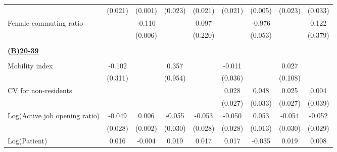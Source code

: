 \begin{tabular}{l*{8}{c}}
                    &     (0.021)         &     (0.001)         &     (0.023)         &     (0.021)         &     (0.021)         &     (0.005)         &     (0.023)         &     (0.033)         \\
\addlinespace
Female commuting ratio&                     &      -0.110\sym{***}&                     &       0.097         &                     &      -0.976\sym{***}&                     &       0.122         \\
                    &                     &     (0.006)         &                     &     (0.220)         &                     &     (0.053)         &                     &     (0.379)         \\
\hline \\ \multicolumn{9}{l}{\textbf{\underline{(B)20-39}}} \\\\[-1ex]
Mobility index      &      -0.102         &                     &       0.357         &                     &      -0.011         &                     &       0.027         &                     \\
                    &     (0.311)         &                     &     (0.954)         &                     &     (0.036)         &                     &     (0.108)         &                     \\
\addlinespace
CV for non-residents&                     &                     &                     &                     &       0.028         &       0.048         &       0.025         &       0.004         \\
                    &                     &                     &                     &                     &     (0.027)         &     (0.033)         &     (0.027)         &     (0.039)         \\
\addlinespace
Log(Active job opening ratio)&      -0.049\sym{*}  &       0.006\sym{***}&      -0.055\sym{*}  &      -0.053\sym{*}  &      -0.050\sym{*}  &       0.053\sym{***}&      -0.054\sym{*}  &      -0.052\sym{*}  \\
                    &     (0.028)         &     (0.002)         &     (0.030)         &     (0.028)         &     (0.028)         &     (0.013)         &     (0.030)         &     (0.029)         \\
\addlinespace
Log(Patient)        &       0.016         &      -0.004\sym{***}&       0.019\sym{*}  &       0.017\sym{*}  &       0.017\sym{*}  &      -0.035\sym{***}&       0.019\sym{*}  &       0.008         \\

\end{tabular}
